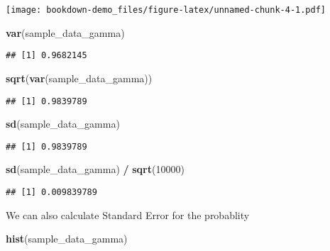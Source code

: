 \documentclass[
]{book}
\newenvironment{Shaded}{\begin{snugshade}}{\end{snugshade}}
\newcommand{\DecValTok}[1]{\textcolor[rgb]{0.00,0.00,0.81}{#1}}
\newcommand{\KeywordTok}[1]{\textcolor[rgb]{0.13,0.29,0.53}{\textbf{#1}}}
\newcommand{\NormalTok}[1]{#1}
\newcommand{\OperatorTok}[1]{\textcolor[rgb]{0.81,0.36,0.00}{\textbf{#1}}}
\newcommand{\StringTok}[1]{\textcolor[rgb]{0.31,0.60,0.02}{#1}}
\begin{document}
\texttt{[image: bookdown-demo\_files/figure-latex/unnamed-chunk-4-1.pdf]}

\begin{Shaded}
\begin{Highlighting}[]
\KeywordTok{var}\NormalTok{(sample_data_gamma)}
\end{Highlighting}
\end{Shaded}

\begin{verbatim}
## [1] 0.9682145
\end{verbatim}

\begin{Shaded}
\begin{Highlighting}[]
\KeywordTok{sqrt}\NormalTok{(}\KeywordTok{var}\NormalTok{(sample_data_gamma))}
\end{Highlighting}
\end{Shaded}

\begin{verbatim}
## [1] 0.9839789
\end{verbatim}

\begin{Shaded}
\begin{Highlighting}[]
\KeywordTok{sd}\NormalTok{(sample_data_gamma) }
\end{Highlighting}
\end{Shaded}

\begin{verbatim}
## [1] 0.9839789
\end{verbatim}

\begin{Shaded}
\begin{Highlighting}[]
\KeywordTok{sd}\NormalTok{(sample_data_gamma) }\OperatorTok{/}\StringTok{ }\KeywordTok{sqrt}\NormalTok{(}\DecValTok{10000}\NormalTok{)}
\end{Highlighting}
\end{Shaded}

\begin{verbatim}
## [1] 0.009839789
\end{verbatim}

We can also calculate Standard Error for the probablity

\begin{Shaded}
\begin{Highlighting}[]
\KeywordTok{hist}\NormalTok{(sample_data_gamma)}
\end{Highlighting}
\end{Shaded}
\end{document}
